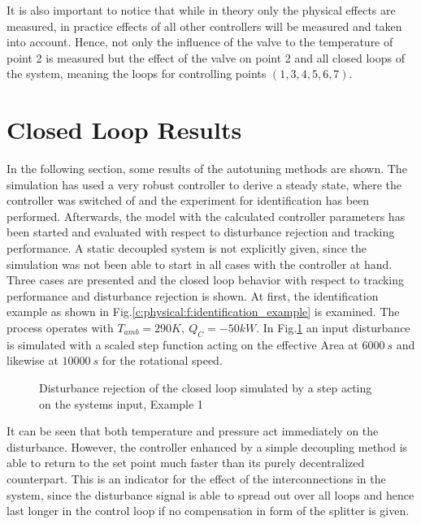 It is also important to notice that while in theory only the physical effects are measured, in practice effects of all other controllers will be measured and taken into account. Hence, not only the influence of the valve to the temperature of point 2 is measured but the effect of the valve on point 2 and all closed loops of the system, meaning the loops for controlling points $(1,3,4,5,6,7)$.\\


\newpage
\section{Closed Loop Results} \label{c:physical:s:closedloop}

In the following section, some results of the autotuning methods are shown. The simulation has used a very robust controller to derive a steady state, where the controller was switched of and the experiment for identification has been performed. Afterwards, the model with the calculated controller parameters has been started and evaluated with respect to disturbance rejection and tracking performance. A static decoupled system is not explicitly given, since the simulation was not been able to start in all cases with the controller at hand.\\

Three cases are presented and the closed loop behavior with respect to tracking performance and disturbance rejection is shown. At first, the identification example as shown in Fig.\ref{c:physical:f:identification_example} is examined. The process operates with $T_{amb} = 290 K,~Q_C = -50 kW$. In Fig.\ref{c:physical:f:disturbance1} an input disturbance is simulated with a scaled step function acting on the effective Area at $6000~s$ and likewise at $10000~s$ for the rotational speed.

\begin{figure}[H]

\caption{Disturbance rejection of the closed loop simulated by a step acting on the systems input, Example 1}
\label{c:physical:f:disturbance1}
\end{figure}

It can be seen that both temperature and pressure act immediately on the disturbance. However, the controller enhanced by a simple decoupling method is able to return to the set point much faster than its purely decentralized counterpart. This is an indicator for the effect of the interconnections in the system, since the disturbance signal is able to spread out over all loops and hence last longer in the control loop if no compensation in form of the splitter is given.\\

